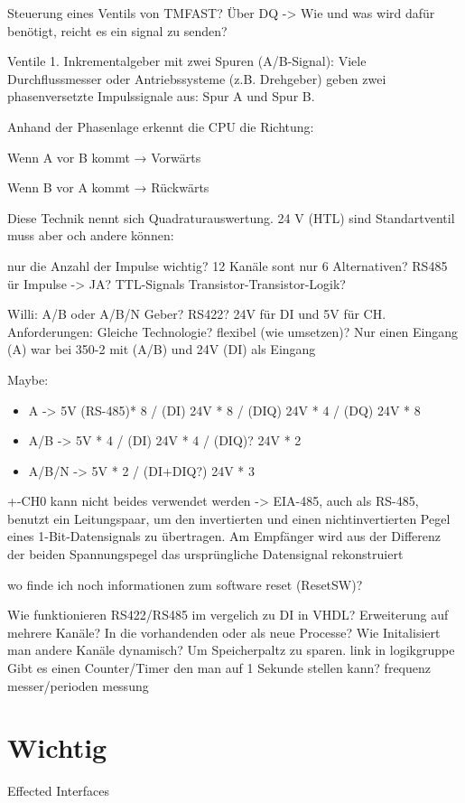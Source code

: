 Steuerung eines Ventils von TMFAST? Über DQ -> Wie und was wird dafür benötigt, reicht es ein signal zu senden?

Ventile
1. Inkrementalgeber mit zwei Spuren (A/B-Signal):
Viele Durchflussmesser oder Antriebssysteme (z.B. Drehgeber) geben zwei phasenversetzte Impulssignale aus: Spur A und Spur B.

Anhand der Phasenlage erkennt die CPU die Richtung:

Wenn A vor B kommt → Vorwärts

Wenn B vor A kommt → Rückwärts

Diese Technik nennt sich Quadraturauswertung. 24 V (HTL) sind Standartventil muss aber och andere können:

nur die Anzahl der Impulse wichtig? 12 Kanäle sont nur 6 Alternativen? RS485 ür Impulse -> JA? TTL-Signals Transistor-Transistor-Logik?

Willi: A/B oder A/B/N Geber? RS422? 24V für DI und 5V für CH. Anforderungen: Gleiche Technologie? flexibel (wie umsetzen)? Nur einen Eingang (A) war bei 350-2 mit (A/B) und 24V (DI) als Eingang



Maybe: 
\begin{itemize}
    \item A -> 5V (RS-485)* 8 / (DI) 24V * 8 / (DIQ) 24V * 4 / (DQ) 24V * 8
    \item A/B ->  5V * 4 / (DI) 24V * 4 / (DIQ)? 24V * 2
    \item A/B/N -> 5V * 2 / (DI+DIQ?) 24V * 3 
\end{itemize}

+-CH0 kann nicht beides verwendet werden -> EIA-485, auch als RS-485, benutzt ein Leitungspaar, um den invertierten und einen nichtinvertierten Pegel eines 1-Bit-Datensignals zu übertragen. Am Empfänger wird aus der Differenz der beiden Spannungspegel das ursprüngliche Datensignal rekonstruiert


wo finde ich noch informationen zum software reset (ResetSW)?

Wie funktionieren RS422/RS485 im vergelich zu DI in VHDL? 
Erweiterung auf mehrere Kanäle? In die vorhandenden oder als neue Processe?
Wie Initalisiert man andere Kanäle dynamisch? Um Speicherpaltz zu sparen. link in logikgruppe
Gibt es einen Counter/Timer den man auf 1 Sekunde stellen kann? frequenz messer/perioden messung


\chapter{Wichtig}
Effected Interfaces 

